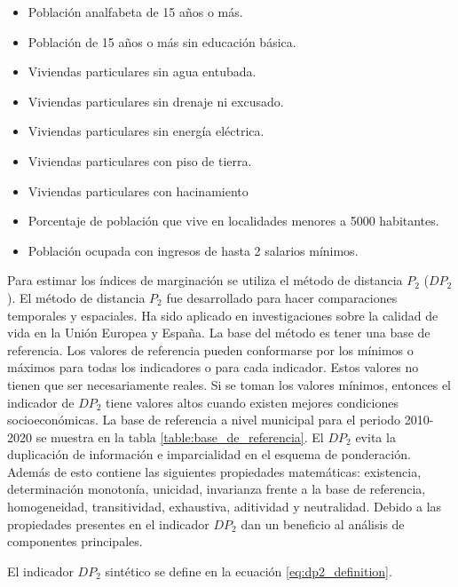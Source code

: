 \begin{itemize}
    \item Población analfabeta de 15 años o más.
    \item Población de 15 años o más sin educación básica.
    \item Viviendas particulares sin agua entubada.
    \item Viviendas particulares sin drenaje ni excusado.
    \item Viviendas particulares sin energía eléctrica.
    \item Viviendas particulares con piso de tierra.
    \item Viviendas particulares con hacinamiento
    \item Porcentaje de población que vive en localidades menores a 5000 habitantes.
    \item Población ocupada con ingresos de hasta 2 salarios mínimos.
\end{itemize}


Para estimar los índices de marginación se utiliza el método de distancia $P_2$\cite{Trapero_1977} ($DP_2$). El método de distancia $P_2$ fue desarrollado para hacer comparaciones temporales y espaciales. Ha sido aplicado en investigaciones sobre la calidad de vida en la Unión Europea y España\cite{Somarriba_2008,Zarzoza_2012,Zarzoza_1996,Nayak_2012}. La base del método es tener una base de referencia. Los valores de referencia pueden conformarse por los mínimos o máximos para todas los indicadores o para cada indicador. Estos valores no tienen que ser necesariamente reales. Si se toman los valores mínimos, entonces el indicador de $DP_2$ tiene valores altos cuando existen mejores condiciones socioeconómicas. La base de referencia a nivel municipal para el periodo 2010-2020 se muestra en la tabla \ref{table:base_de_referencia}\cite{CONAPO_2022}. El $DP_2$ evita la duplicación de información e imparcialidad en el esquema de ponderación. Además de esto contiene las siguientes propiedades matemáticas: existencia, determinación monotonía, unicidad, invarianza frente a la base de referencia, homogeneidad, transitividad, exhaustiva, aditividad y neutralidad\cite{Somarriba_2008,Espina_2012}. Debido a las propiedades presentes en el indicador $DP_2$ dan un beneficio al análisis de componentes principales\cite{Somarriba_2008}.



El indicador $DP_2$ sintético se define en la ecuación \ref{eq:dp2_definition}.

